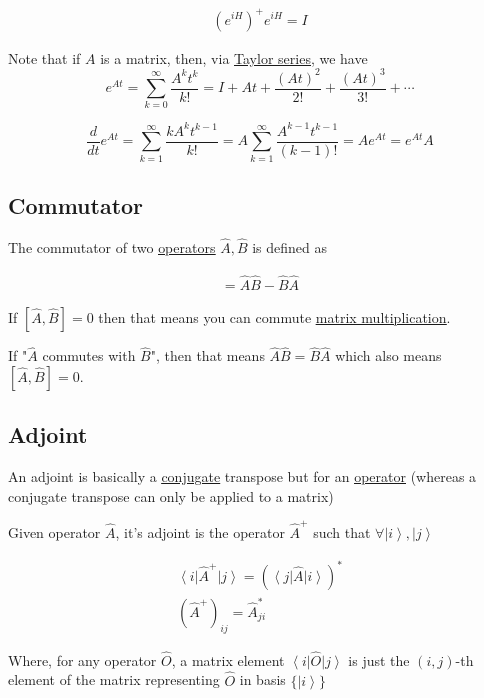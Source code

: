 \documentclass[
]{article}
\let\oldhyperref\hyperref
\renewcommand{\hyperref}[2][]{\oldhyperref[#1]{\underline{#2}}}
\providecommand{\ket}[1]{\left\lvert #1 \right\rangle}
\providecommand{\bra}[1]{\left\langle #1 \right\rvert}
\begin{document}
\begin{gather*}
	(e^{iH})^+e^{iH}=I
\end{gather*}

Note that if $A$ is a matrix, then, via \hyperref[taylor-series]{Taylor series}, we have
\[e^{At} = \sum_{k=0}^{\infty}\frac{A^k t^k}{k!} = I + At + \frac{(At)^2}{2!} + \frac{(At)^3}{3!} + \cdots\]

\[\frac{d}{dt}e^{At} = \sum_{k=1}^{\infty}\frac{kA^k t^{k-1}}{k!} = A\sum_{k=1}^{\infty}\frac{A^{k-1}t^{k-1}}{(k-1)!} = Ae^{At} = e^{At}A\]

\subsection{Commutator}\label{commutators}

The commutator of two \hyperref[operators]{operators} \(\hat{A},\hat{B}\) is defined as

\begin{gather*}
	[\hat{A},\hat{B}]=\hat{A}\hat{B}-\hat{B}\hat{A}
\end{gather*}

If \([\hat{A},\hat{B}]=0\) then that means you can commute
\hyperref[bra-ket-matrix-multiplication]{matrix
	multiplication}.

If "\(\hat{A}\) commutes with \(\hat{B}\)", then that means \(\hat{A}\hat{B}=\hat{B}\hat{A}\) which also means \([\hat{A},\hat{B}]=0\).

\subsection{Adjoint}\label{adjoint}

An adjoint is basically a \hyperref[conjugate]{conjugate} transpose but for an \hyperref[operators]{operator}
(whereas a conjugate transpose can only be applied to a matrix)

Given operator \(\hat{A}\), it's adjoint is the operator \(\hat{A}^+\)
such that \(\forall\ket{i},\ket{j}\)

\begin{gather*}
	\bra{i}\hat{A}^+\ket{j}=(\bra{j}\hat{A}\ket{i})^*\\
	(\hat{A}^+)_{ij}=\hat{A}^*_{ji}
\end{gather*}

Where, for any operator \(\hat{O}\), a matrix element
\(\bra{i}\hat{O}\ket{j}\) is just the \((i,j)\)-th element of the matrix
representing \(\hat{O}\) in basis \(\{\ket{i}\}\)
\end{document}
